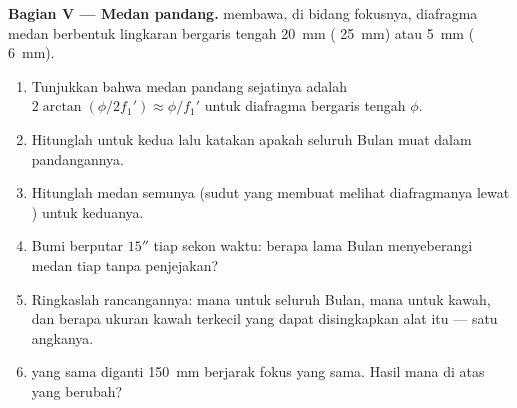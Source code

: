 \begin{problem}
\medskip
\noindent\textbf{Bagian V --- Medan pandang.}
 membawa, di bidang fokusnya, diafragma medan berbentuk
lingkaran bergaris tengah \qty{20}{mm} ( \qty{25}{mm}) atau
\qty{5}{mm} ( \qty{6}{mm}).
\begin{enumerate}[resume]
  \item Tunjukkan bahwa medan pandang sejatinya adalah
        $2\arctan(\phi/2f_1')
        \approx \phi/f_1'$ untuk diafragma bergaris tengah $\phi$.
  \item Hitunglah untuk kedua  lalu katakan apakah seluruh
        Bulan muat dalam pandangannya.
  \item Hitunglah medan semunya (sudut yang membuat  melihat
        diafragmanya lewat ) untuk keduanya.
  \item Bumi berputar $15''$ tiap sekon waktu: berapa lama Bulan
        menyeberangi medan tiap  tanpa penjejakan?
  \item Ringkaslah rancangannya:  mana untuk seluruh Bulan, mana
        untuk kawah, dan berapa ukuran kawah terkecil yang dapat
        disingkapkan alat itu --- satu angkanya.
  \item {} yang sama diganti  \qty{150}{mm} berjarak
        fokus yang sama. Hasil mana di atas yang berubah?
\end{enumerate}
\end{problem}
